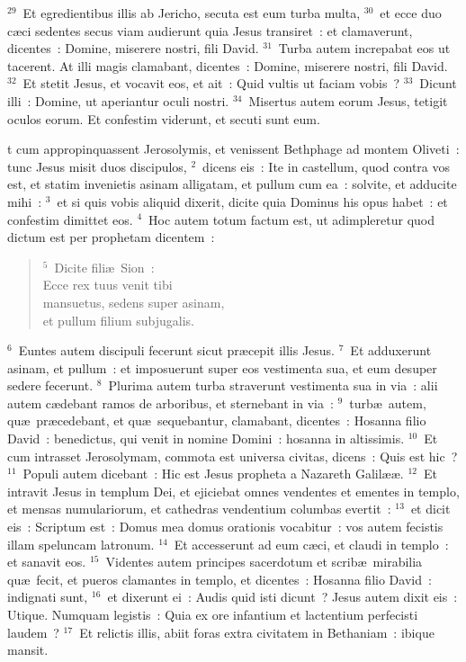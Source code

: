 ${}^{29}$~Et egredientibus illis ab Jericho, secuta est eum turba multa,
${}^{30}$~et ecce duo c\ae ci sedentes secus viam audierunt quia Jesus transiret~: et clamaverunt, dicentes~: Domine, miserere nostri, fili David.
${}^{31}$~Turba autem increpabat eos ut tacerent. At illi magis clamabant, dicentes~: Domine, miserere nostri, fili David.
${}^{32}$~Et stetit Jesus, et vocavit eos, et ait~: Quid vultis ut faciam vobis~?
${}^{33}$~Dicunt illi~: Domine, ut aperiantur oculi nostri.
${}^{34}$~Misertus autem eorum Jesus, tetigit oculos eorum. Et confestim viderunt, et secuti sunt eum.

\bchapter
{}t cum appropinquassent Jerosolymis, et venissent Bethphage ad montem Oliveti~: tunc Jesus misit duos discipulos,
${}^{2}$~dicens eis~: Ite in castellum, quod contra vos est, et statim invenietis asinam alligatam, et pullum cum ea~: solvite, et adducite mihi~:
${}^{3}$~et si quis vobis aliquid dixerit, dicite quia Dominus his opus habet~: et confestim dimittet eos.
${}^{4}$~Hoc autem totum factum est, ut adimpleretur quod dictum est per prophetam dicentem~:
\begin{flushleft}\begin{verse}${}^{5}$~Dicite fili\ae\ Sion~:\\ Ecce rex tuus venit tibi\\ mansuetus, sedens super asinam,\\ et pullum filium subjugalis.\end{verse}\end{flushleft}


${}^{6}$~Euntes autem discipuli fecerunt sicut pr\ae cepit illis Jesus.
${}^{7}$~Et adduxerunt asinam, et pullum~: et imposuerunt super eos vestimenta sua, et eum desuper sedere fecerunt.
${}^{8}$~Plurima autem turba straverunt vestimenta sua in via~: alii autem c\ae debant ramos de arboribus, et sternebant in via~:
${}^{9}$~turb\ae\ autem, qu\ae\ pr\ae cedebant, et qu\ae\ sequebantur, clamabant, dicentes~: Hosanna filio David~: benedictus, qui venit in nomine Domini~: hosanna in altissimis.
${}^{10}$~Et cum intrasset Jerosolymam, commota est universa civitas, dicens~: Quis est hic~?
${}^{11}$~Populi autem dicebant~: Hic est Jesus propheta a Nazareth Galil\ae \ae .
${}^{12}$~Et intravit Jesus in templum Dei, et ejiciebat omnes vendentes et ementes in templo, et mensas numulariorum, et cathedras vendentium columbas evertit~:
${}^{13}$~et dicit eis~: Scriptum est~: Domus mea domus orationis vocabitur~: vos autem fecistis illam speluncam latronum.
${}^{14}$~Et accesserunt ad eum c\ae ci, et claudi in templo~: et sanavit eos.
${}^{15}$~Videntes autem principes sacerdotum et scrib\ae\ mirabilia qu\ae\ fecit, et pueros clamantes in templo, et dicentes~: Hosanna filio David~: indignati sunt,
${}^{16}$~et dixerunt ei~: Audis quid isti dicunt~? Jesus autem dixit eis~: Utique. Numquam legistis~: Quia ex ore infantium et lactentium perfecisti laudem~?
${}^{17}$~Et relictis illis, abiit foras extra civitatem in Bethaniam~: ibique mansit.


